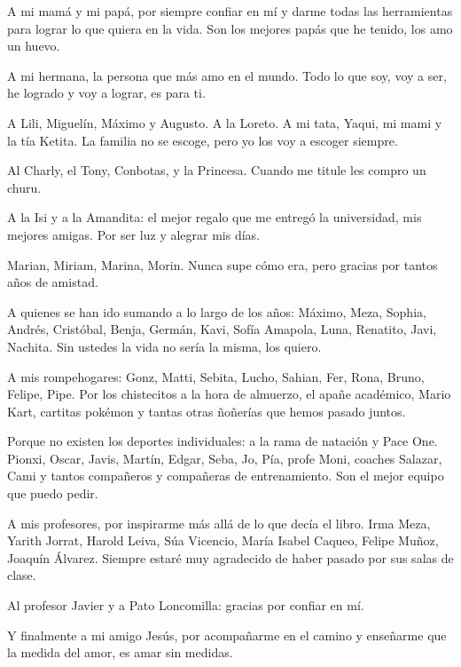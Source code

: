A mi mamá y mi papá, por siempre confiar en mí y darme todas las herramientas para lograr lo que quiera en la vida. Son los mejores papás que he tenido, los amo un huevo.

A mi hermana, la persona que más amo en el mundo. Todo lo que soy, voy a ser, he logrado y voy a lograr, es para ti.

A Lili, Miguelín, Máximo y Augusto. A la Loreto. A mi tata, Yaqui, mi mami y la tía Ketita. La familia no se escoge, pero yo los voy a escoger siempre.
 
Al Charly, el Tony, Conbotas, y la Princesa. Cuando me titule les compro un churu.

A la Isi y a la Amandita: el mejor regalo que me entregó la universidad, mis mejores amigas. Por ser luz y alegrar mis días.

Marian, Miriam, Marina, Morin. Nunca supe cómo era, pero gracias por tantos años de amistad.

 A quienes se han ido sumando a lo largo de los años: Máximo, Meza, Sophia, Andrés, Cristóbal, Benja, Germán, Kavi, Sofía Amapola, Luna, Renatito, Javi, Nachita. Sin ustedes la vida no sería la misma, los quiero.

A mis rompehogares: Gonz, Matti, Sebita, Lucho, Sahian, Fer, Rona, Bruno, Felipe, Pipe. Por los chistecitos a la hora de almuerzo, el apañe académico, Mario Kart, cartitas pokémon y tantas otras ñoñerías que hemos pasado juntos.

Porque no existen los deportes individuales: a la rama de natación y Pace One. Pionxi, Oscar, Javis, Martín, Edgar, Seba, Jo, Pía, profe Moni, coaches Salazar, Cami y tantos compañeros y compañeras de entrenamiento. Son el mejor equipo que puedo pedir.

A mis profesores, por inspirarme más allá de lo que decía el libro. Irma Meza, Yarith Jorrat, Harold Leiva, Súa Vicencio, María Isabel Caqueo, Felipe Muñoz, Joaquín Álvarez. Siempre estaré muy agradecido de haber pasado por sus salas de clase.

Al profesor Javier y a Pato Loncomilla: gracias por confiar en mí.

Y finalmente a mi amigo Jesús, por acompañarme en el camino y enseñarme que la medida del amor, es amar sin medidas.
